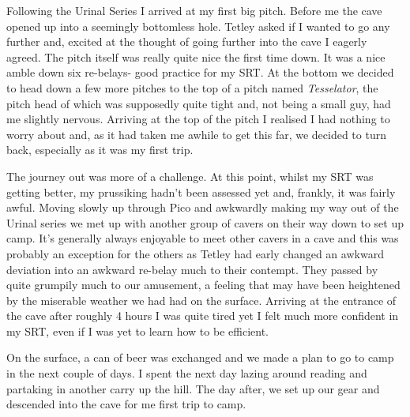 Following the Urinal Series I arrived at my first big pitch. Before me
the cave opened up into a seemingly bottomless hole. Tetley asked if I
wanted to go any further and, excited at the thought of going further
into the cave I eagerly agreed. The pitch itself was really quite nice
the first time down. It was a nice amble down six re-belays- good
practice for my SRT. At the bottom we decided to head down a few more
pitches to the top of a pitch named \emph{Tesselator}, the pitch head of
which was supposedly quite tight and, not being a small guy, had me
slightly nervous. Arriving at the top of the pitch I realised I had
nothing to worry about and, as it had taken me awhile to get this far,
we decided to turn back, especially as it was my first trip.

The journey out was more of a challenge. At this point, whilst my SRT
was getting better, my prussiking hadn't been assessed yet and, frankly,
it was fairly awful. Moving slowly up through Pico and awkwardly making
my way out of the Urinal series we met up with another group of cavers
on their way down to set up camp. It's generally always enjoyable to
meet other cavers in a cave and this was probably an exception for the
others as Tetley had early changed an awkward deviation into an awkward
re-belay much to their contempt. They passed by quite grumpily much to
our amusement, a feeling that may have been heightened by the miserable
weather we had had on the surface. Arriving at the entrance of the cave
after roughly 4 hours I was quite tired yet I felt much more confident
in my SRT, even if I was yet to learn how to be efficient.

On the surface, a can of beer was exchanged and we made a plan to go to
camp in the next couple of days. I spent the next day lazing around
reading and partaking in another carry up the hill. The day after, we
set up our gear and descended into the cave for me first trip to camp.

